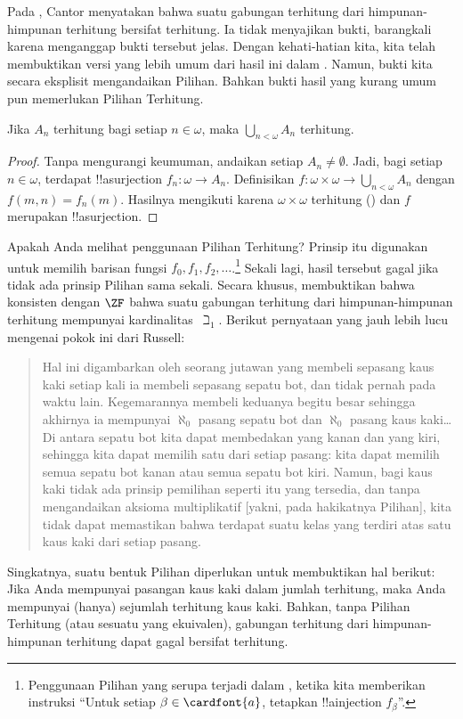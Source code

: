 \documentclass[../../../include/open-logic-section]{subfiles}
\begin{document}
\begin{ex}
Pada \citeyear{Cantor1878}, Cantor menyatakan bahwa suatu gabungan terhitung
dari himpunan-himpunan terhitung bersifat terhitung. Ia tidak menyajikan
bukti, barangkali karena menganggap bukti tersebut jelas. Dengan
kehati-hatian kita, kita telah membuktikan versi yang lebih umum dari hasil
ini dalam . Namun, bukti
kita secara eksplisit mengandaikan Pilihan. Bahkan bukti hasil yang kurang
umum pun memerlukan Pilihan Terhitung.

\begin{thm}
Jika $A_n$ terhitung bagi setiap $n\in\omega$, maka
$\bigcup_{n<\omega}A_n$ terhitung.
\end{thm}

\begin{proof}
Tanpa mengurangi keumuman, andaikan setiap $A_n\neq\emptyset$. Jadi, bagi
setiap $n\in\omega$, terdapat !!a{surjection}
$f_n\colon\omega\to A_n$. Definisikan
$f\colon\omega\times\omega\to\bigcup_{n<\omega}A_n$ dengan
$f(m,n)=f_n(m)$. Hasilnya mengikuti karena $\omega\times\omega$ terhitung
() dan $f$ merupakan
!!a{surjection}.
\end{proof}
\noindent
Apakah Anda melihat penggunaan Pilihan Terhitung? Prinsip itu digunakan
untuk memilih barisan fungsi $f_0,f_1,f_2,\dots$.\footnote{Penggunaan Pilihan
yang serupa terjadi dalam
, ketika kita memberikan
instruksi ``Untuk setiap $\beta\in\cardfont{a}$, tetapkan
!!a{injection} $f_\beta$''.} Sekali lagi, hasil tersebut gagal jika tidak
ada prinsip Pilihan sama sekali. Secara khusus,
\citet{FefermanLevy1963} membuktikan bahwa konsisten dengan $\ZF$ bahwa
suatu gabungan terhitung dari himpunan-himpunan terhitung mempunyai
kardinalitas~$\beth_1$. Berikut pernyataan yang jauh lebih lucu mengenai
pokok ini dari Russell:
\begin{quote}
  Hal ini digambarkan oleh seorang jutawan yang membeli sepasang kaus kaki
  setiap kali ia membeli sepasang sepatu bot, dan tidak pernah pada waktu
  lain. Kegemarannya membeli keduanya begitu besar sehingga akhirnya ia
  mempunyai $\aleph_0$ pasang sepatu bot dan $\aleph_0$ pasang kaus
  kaki\dots\@ Di antara sepatu bot kita dapat membedakan yang kanan dan yang
  kiri, sehingga kita dapat memilih satu dari setiap pasang: kita dapat
  memilih semua sepatu bot kanan atau semua sepatu bot kiri. Namun, bagi kaus
  kaki tidak ada prinsip pemilihan seperti itu yang tersedia, dan tanpa
  mengandaikan aksioma multiplikatif [yakni, pada hakikatnya Pilihan], kita
  tidak dapat memastikan bahwa terdapat suatu kelas yang terdiri atas satu
  kaus kaki dari setiap pasang.
  \citep[hlm.~126]{Russell1919}
\end{quote}
Singkatnya, suatu bentuk Pilihan diperlukan untuk membuktikan hal berikut:
Jika Anda mempunyai pasangan kaus kaki dalam jumlah terhitung, maka Anda
mempunyai (hanya) sejumlah terhitung kaus kaki. Bahkan, tanpa Pilihan
Terhitung (atau sesuatu yang ekuivalen), gabungan terhitung dari
himpunan-himpunan terhitung dapat gagal bersifat terhitung.
\end{ex}
\end{document}
